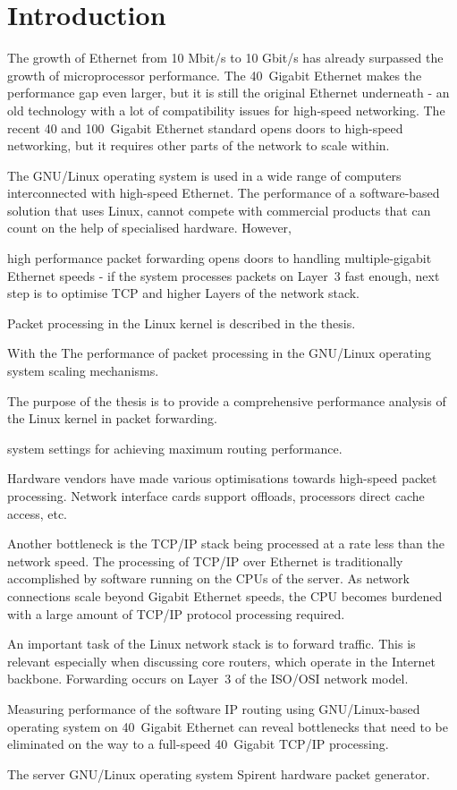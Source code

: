 
\chapter{Introduction}
The growth of Ethernet from 10 Mbit/s to 10 Gbit/s has already surpassed
the growth of microprocessor performance.
The 40~Gigabit Ethernet makes the performance gap even larger, but
it is still the original Ethernet underneath - an old technology
with a lot of compatibility issues for high-speed networking.
The recent 40 and 100~Gigabit Ethernet standard opens doors to
high-speed networking, but it requires other parts of the network to scale within.

The GNU/Linux operating system is used in a wide range of computers interconnected with high-speed Ethernet.
The performance of a software-based solution that uses Linux, cannot compete
with commercial products that can count on the help of specialised hardware.
However,

high performance packet forwarding opens doors to handling multiple-gigabit Ethernet speeds -
if the system processes packets on Layer~3 fast enough,
next step is to optimise TCP and higher Layers of the network stack.

Packet processing in the Linux kernel is described in the thesis.

With the 
The performance of packet processing in the GNU/Linux operating
system 
scaling mechanisms.


The purpose of the thesis
is to provide a comprehensive performance analysis of the Linux kernel
in packet forwarding.

system settings for achieving maximum routing performance.



Hardware vendors have made various optimisations towards high-speed packet processing.
Network interface cards support offloads, processors direct cache access, etc.


Another bottleneck is the TCP/IP stack being processed at a rate less than the network speed.
The processing of TCP/IP over Ethernet is traditionally accomplished by software running on the CPUs of the server.
As network connections scale beyond Gigabit Ethernet speeds,
the CPU becomes burdened with a large amount of TCP/IP protocol processing required.


An important task of the Linux network stack is to forward traffic.
This is relevant especially when discussing core routers, which operate in the Internet backbone.
Forwarding occurs on Layer~3 of the ISO/OSI network model.

Measuring performance of the software IP routing using GNU/Linux-based operating system on 40~Gigabit Ethernet
can reveal bottlenecks that need to be eliminated
on the way to a full-speed 40~Gigabit TCP/IP processing.

The server GNU/Linux operating system
Spirent hardware packet generator.

